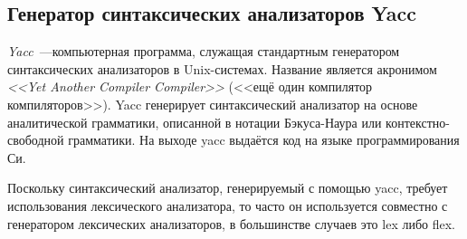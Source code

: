 \subsection{Генератор синтаксических анализаторов Yacc} \label{sub116}

\textit{Yacc}~---компьютерная программа, служащая стандартным генератором синтаксических анализаторов в Unix-системах. Название является акронимом \textit{<<Yet Another Compiler Compiler>>} (<<ещё один компилятор компиляторов>>). Yacc генерирует синтаксический анализатор на основе аналитической грамматики, описанной в нотации Бэкуса-Наура или контекстно-свободной грамматики. На выходе yacc выдаётся код на языке программирования Си.

Поскольку синтаксический анализатор, генерируемый с помощью yacc, требует использования лексического анализатора, то часто он используется совместно с генератором лексических анализаторов, в большинстве случаев это lex либо flex. 

